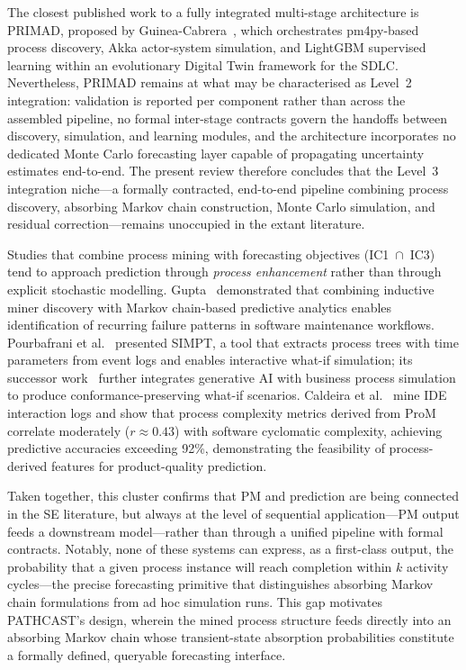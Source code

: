 The closest published work to a fully integrated multi-stage architecture is
PRIMAD, proposed by Guinea-Cabrera~\cite{guinea2025}, which orchestrates
pm4py-based process discovery, Akka actor-system simulation, and LightGBM
supervised learning within an evolutionary Digital Twin framework for the SDLC.
Nevertheless, PRIMAD remains at what may be characterised as Level~2 integration:
validation is reported per component rather than across the assembled pipeline,
no formal inter-stage contracts govern the handoffs between discovery,
simulation, and learning modules, and the architecture incorporates no dedicated
Monte Carlo forecasting layer capable of propagating uncertainty estimates
end-to-end. The present review therefore concludes that the Level~3 integration
niche---a formally contracted, end-to-end pipeline combining process discovery,
absorbing Markov chain construction, Monte Carlo simulation, and residual
correction---remains unoccupied in the extant literature.

Studies that combine process mining with forecasting objectives (IC1~$\cap$~IC3)
tend to approach prediction through \emph{process enhancement} rather than
through explicit stochastic modelling. Gupta~\cite{gupta2017} demonstrated that
combining inductive miner discovery with Markov chain-based predictive analytics
enables identification of recurring failure patterns in software maintenance
workflows. Pourbafrani et al.~\cite{pourbafrani2021} presented SIMPT, a tool
that extracts process trees with time parameters from event logs and enables
interactive what-if simulation; its successor work~\cite{buliga2025} further
integrates generative AI with business process simulation to produce
conformance-preserving what-if scenarios. Caldeira et al.~\cite{caldeira2022}
mine IDE interaction logs and show that process complexity metrics derived from
ProM correlate moderately ($r \approx 0.43$) with software cyclomatic
complexity, achieving predictive accuracies exceeding 92\%, demonstrating the
feasibility of process-derived features for product-quality prediction.

Taken together, this cluster confirms that PM and prediction are being connected
in the SE literature, but always at the level of sequential application---PM
output feeds a downstream model---rather than through a unified pipeline with
formal contracts. Notably, none of these systems can express, as a first-class
output, the probability that a given process instance will reach completion
within $k$ activity cycles---the precise forecasting primitive that distinguishes
absorbing Markov chain formulations from ad hoc simulation runs. This gap
motivates PATHCAST's design, wherein the mined process structure feeds directly
into an absorbing Markov chain whose transient-state absorption probabilities
constitute a formally defined, queryable forecasting interface.


